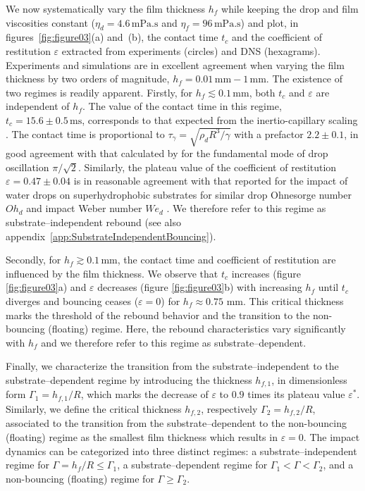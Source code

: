 \documentclass[]{jfm}
\newcommand{\Ohd}{\mathit{Oh}_\mathit{d}}
\newcommand{\Wen}{\mathit{We}_\mathit{d}}
\begin{document}
	We now systematically vary the film thickness $h_{f}$ while keeping the drop and film viscosities constant ($\eta_d = 4.6\,\si{\milli\pascal}.\si{\second}$ and $\eta_f = 96\,\si{\milli\pascal}.\si{\second}$) and plot, in figures~\ref{fig:figure03}(a) and~(b), the contact time $t_c$ and the coefficient of restitution $\varepsilon$ extracted from experiments (circles) and  DNS (hexagrams).
	Experiments and simulations are in excellent agreement when varying the film thickness by two orders of magnitude, $h_{f} = 0.01\,\si{\milli\meter} - 1\,\si{\milli\meter}$. 
	The existence of two regimes is readily apparent. Firstly, for $h_{f} \lesssim 0.1\,\si{\milli\meter}$, both $t_{c}$ and $\varepsilon$ are independent of $h_f$. The value of the contact time in this regime, $t_c = 15.6 \pm 0.5\,\si{\milli\second}$, corresponds to that expected from the inertio-capillary scaling \citep{wachters1966heat, richard2002contact}. The contact time is proportional to $\tau_\gamma = \sqrt{\rho_d R^3/ \gamma}$ with a prefactor $2.2 \pm 0.1$, in good agreement with that calculated by \citet{rayleigh1879capillary} for the fundamental mode of drop oscillation $\pi/\sqrt 2$. Similarly, the plateau value of the coefficient of restitution $\varepsilon = 0.47 \pm 0.04$ is in reasonable agreement with that reported for the impact of water drops on superhydrophobic substrates for similar drop Ohnesorge number $\Ohd$ and impact Weber number $\Wen$ \citep{jha2020viscous}. We therefore refer to this regime as substrate--independent rebound (see also appendix~\ref{app:SubstrateIndependentBouncing}). 
	
	Secondly, for $h_{f} \gtrsim 0.1\,\si{\milli\meter}$, the contact time and coefficient of restitution are influenced by the film thickness. We observe that $t_c$ increases (figure \ref{fig:figure03}a) and $\varepsilon$ decreases (figure \ref{fig:figure03}b) with increasing $h_f$ until $t_c$ diverges and bouncing ceases ($\varepsilon = 0$) for $h_f \approx 0.75$ mm. This critical thickness marks the threshold of the rebound behavior and the transition to the non-bouncing (floating) regime. Here, the rebound characteristics vary significantly with $h_f$ and we therefore refer to this regime as substrate--dependent.
	
	Finally, we characterize the transition from the substrate--independent to the substrate--dependent regime by introducing the thickness $h_{f,1}$, in dimensionless form $\Gamma_1 = h_{f,1}/R$, which marks the decrease of $\varepsilon$ to $0.9$ times its plateau value $\varepsilon^*$. 
	Similarly, we define the critical thickness $h_{f,2}$, respectively $\Gamma_2 = h_{f,2}/R$, associated to the transition from the substrate--dependent to the non-bouncing (floating) regime as the smallest film thickness which results in $\varepsilon = 0$. 
	The impact dynamics can be categorized into three distinct regimes: a substrate--independent regime for $\Gamma = h_{f}/R \le \Gamma_1$, a substrate--dependent regime for $\Gamma_1 < \Gamma < \Gamma_2$, and a non-bouncing (floating) regime for $\Gamma \ge \Gamma_2$.
	
\end{document}
